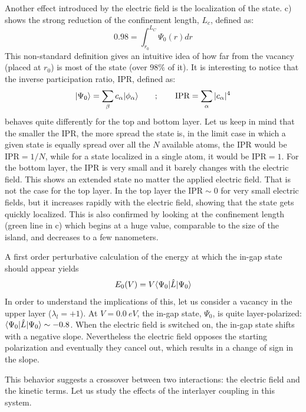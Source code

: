 Another effect introduced by the electric field is the localization of the state. c) shows the strong reduction of the confinement length, $L_c$, defined as:
\begin{equation}
  0.98 = \int_{r_0}^{L_C} \Psi_0(r) dr   %
\end{equation}
This non-standard definition gives an intuitive idea of how far from the vacancy (placed at $r_0$) is most of the state (over $98\%$ of it).
It is interesting to notice that the inverse participation ratio, IPR, defined as:
\begin{equation}
  |\Psi_0\rangle = \sum_\beta c_\alpha|\phi_\alpha\rangle\quad\quad;\quad\quad
  \text{IPR} = \sum_\alpha |c_\alpha|^4
\end{equation}
behaves quite differently for the top and bottom layer. Let us keep in mind that the smaller the IPR, the more spread the state is, in the limit case in which a given state is equally spread over all the $N$ available atoms, the IPR would be $\text{IPR}=1/N$, while for a state localized in a single atom, it would be $\text{IPR}=1$.
For the bottom layer, the IPR is very small and it barely changes with the electric field. This shows an extended state no matter the applied electric field. That is not the case for the top layer. In the top layer the $\text{IPR}\sim0$ for very small electric fields, but it increases rapidly with the electric field, showing that the state gets quickly localized. This is also confirmed by looking at the confinement length (green line in c) which begins at a huge value, comparable to the size of the island, and decreases to a few nanometers.


A first order perturbative calculation of the energy at which the in-gap state should appear yields
\begin{equation}
  E_0 (V) = V \langle\Psi_0|\hat{L}|\Psi_0\rangle
\end{equation}
In order to understand the implications of this, let us consider a vacancy in the upper layer ($\lambda_l=+1$). At $V=\SI{0.0}{eV}$, the in-gap state, $\Psi_0$, is quite layer-polarized: $\langle\Psi_0|\hat{L}|\Psi_0\rangle\sim-0.8$. When the electric field is switched on, the in-gap state shifts with a negative slope. Nevertheless the electric field opposes the starting polarization and eventually they cancel out, which results in a change of sign in the slope. %

This behavior suggests a crossover between two interactions: the electric field and the kinetic terms. Let us study the effects of the interlayer coupling in this system.


